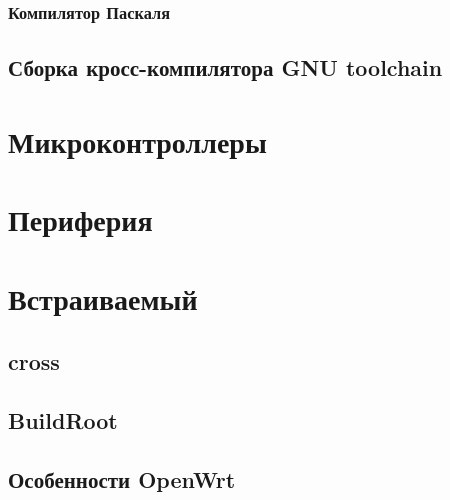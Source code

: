 \section{Компилятор Паскаля}

\chapter{Сборка кросс-компилятора GNU toolchain}

\part{Микроконтроллеры \cmx}

\part{Периферия}

\part{Встраиваемый \emlinux}

\chapter{cross}

\chapter{BuildRoot}

\chapter{Особенности OpenWrt}



